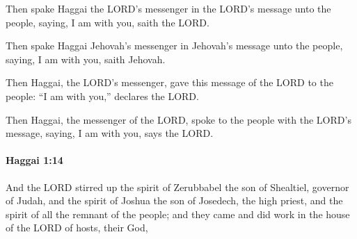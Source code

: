 			Then spake Haggai the LORD’s messenger in the LORD’s message unto the people, saying, I am with you, saith the LORD.

			\begin{versebox}
					\item[BHS] 
					\item[LXX] 
					\item[ASV] Then spake Haggai Jehovah's messenger in Jehovah's message unto the people, saying, I am with you, saith Jehovah.
					\item[NIV] Then Haggai, the LORD’s messenger, gave this message of the LORD to the people: “I am with you,” declares the LORD.
					\item[NRSV] Then Haggai, the messenger of the LORD, spoke to the people with the LORD’s message, saying, I am with you, says the LORD.
			\end{versebox}

		\paragraph{Haggai 1:14} %
			\label{HAGGAI-1-14}

			And the LORD stirred up the spirit of Zerubbabel the son of Shealtiel, governor of Judah, and the spirit of Joshua the son of Josedech, the high priest, and the spirit of all the remnant of the people; and they came and did work in the house of the LORD of hosts, their God,

